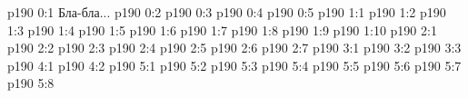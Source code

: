 \author{Промежуточные создания}
\vs p190 0:1  Бла-бла...
\vs p190 0:2 
\vs p190 0:3 
\vs p190 0:4 
\vs p190 0:5 \pc 
{}
\vs p190 1:1 
\vs p190 1:2 
\vs p190 1:3 
\vs p190 1:4 
\vs p190 1:5 \pc 
\vs p190 1:6 \pc 
\vs p190 1:7 \pc 
\vs p190 1:8 \pc 
\vs p190 1:9 
\vs p190 1:10 
\vs p190 2:1 
\vs p190 2:2 
\vs p190 2:3 
\vs p190 2:4 
\vs p190 2:5 
\vs p190 2:6 \pc 
\vs p190 2:7 \pc 
{}
\vs p190 3:1 
\vs p190 3:2 \pc 
\vs p190 3:3 \pc 
{}
\vs p190 4:1 
\vs p190 4:2 \pc 
{}
\vs p190 5:1 
\vs p190 5:2 
\vs p190 5:3 
\vs p190 5:4 
\vs p190 5:5 
\vs p190 5:6 
\vs p190 5:7 
\vs p190 5:8 
\quizlink
